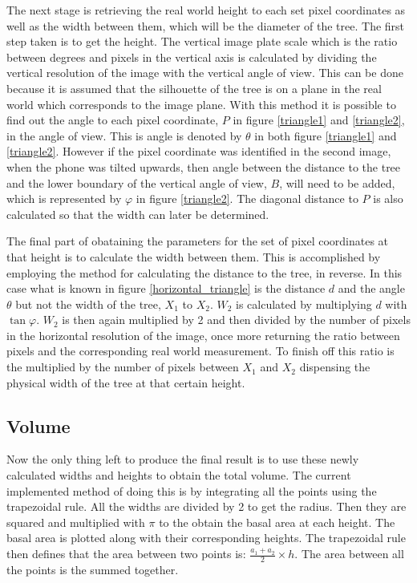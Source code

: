 The next stage is retrieving the real world height to each set pixel coordinates as well as the width between them, which will be the diameter of the tree. The first step taken is to get the height. The vertical image plate scale which is the ratio between degrees and pixels in the vertical axis is calculated by dividing the vertical resolution of the image with the vertical angle of view. This can be done because it is assumed that the silhouette of the tree is on a plane in the real world which corresponds to the image plane. With this method it is possible to find out the angle to each pixel coordinate, $P$ in figure \ref{triangle1} and \ref{triangle2}, in the angle of view. This is angle is denoted by $\theta$ in both figure \ref{triangle1} and \ref{triangle2}. However if the pixel coordinate was identified in the second image, when the phone was tilted upwards, then angle between the distance to the tree and the lower boundary of the vertical angle of view, $B$, will need to be added, which is represented by $\varphi$ in figure \ref{triangle2}. The diagonal distance to $P$ is also calculated so that the width can later be determined.

The final part of obataining the parameters for the set of pixel coordinates at that height is to calculate the width between them. This is accomplished by employing the method for calculating the distance to the tree, in reverse. In this case what is known in figure \ref{horizontal_triangle} is the distance $d$ and the angle $\theta$ but not the width of the tree, $X_1$ to $X_2$. $W_2$ is calculated by multiplying $d$ with $\tan{\varphi}$. $W_2$ is then again multiplied by 2 and then divided by the number of pixels in the horizontal resolution of the image, once more returning the ratio between pixels and the corresponding real world measurement. To finish off this ratio is the multiplied by the number of pixels between $X_1$ and $X_2$ dispensing the physical width of the tree at that certain height.


\subsection{Volume}
Now the only thing left to produce the final result is to use these newly calculated widths and heights to obtain the total volume. The current implemented method of doing this is by integrating all the points using the trapezoidal rule. All the widths are divided by 2 to get the radius. Then they are squared and multiplied with $\pi$ to the obtain the basal area at each height. The basal area is plotted along with their corresponding heights. The trapezoidal rule then defines that the area between two points is: $\frac{a_1 + a_2}{2} \times h$. The area between all the points is the summed together.


